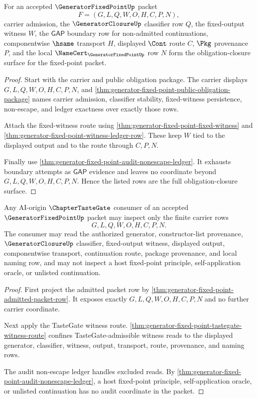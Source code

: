 \begin{theorem}
\label{thm:generator-fixed-point-obligation-closure-readiness}
For an accepted $\GeneratorFixedPointUp$ packet
$$
F=(G,L,Q,W,O,H,C,P,N),
$$
carrier admission, the $\GeneratorClosureUp$ classifier row $Q$, the fixed-output witness $W$, the $\mathsf{GAP}$ boundary row for non-admitted continuations, componentwise $\hsame$ transport $H$, displayed $\Cont$ route $C$, $\Pkg$ provenance $P$, and the local $\NameCert_{\GeneratorFixedPointUp}$ row $N$ form the obligation-closure surface for the fixed-point packet.
\end{theorem}
\begin{proof}
Start with the carrier and public obligation package. The carrier displays $G,L,Q,W,O,H,C,P,N$, and \autoref{thm:generator-fixed-point-public-obligation-package} names carrier admission, classifier stability, fixed-witness persistence, non-escape, and ledger exactness over exactly those rows.

Attach the fixed-witness route using \autoref{thm:generator-fixed-point-fixed-witness} and \autoref{thm:generator-fixed-point-witness-ledger-row}. These keep $W$ tied to the displayed output and to the route through $C,P,N$.

Finally use \autoref{thm:generator-fixed-point-audit-nonescape-ledger}. It exhausts boundary attempts as $\mathsf{GAP}$ evidence and leaves no coordinate beyond $G,L,Q,W,O,H,C,P,N$. Hence the listed rows are the full obligation-closure surface.
\end{proof}

\begin{theorem}
\label{thm:generator-fixed-point-tastegate-carrier-surface}
Any AI-origin $\ChapterTasteGate$ consumer of an accepted $\GeneratorFixedPointUp$ packet may inspect only the finite carrier rows
$$
G,L,Q,W,O,H,C,P,N.
$$
The consumer may read the authorized generator, constructor-list provenance, $\GeneratorClosureUp$ classifier, fixed-output witness, displayed output, componentwise transport, continuation route, package provenance, and local naming row, and may not inspect a host fixed-point principle, self-application oracle, or unlisted continuation.
\end{theorem}
\begin{proof}
First project the admitted packet row by \autoref{thm:generator-fixed-point-admitted-packet-row}. It exposes exactly $G,L,Q,W,O,H,C,P,N$ and no further carrier coordinate.

Next apply the TasteGate witness route. \autoref{thm:generator-fixed-point-tastegate-witness-route} confines TasteGate-admissible witness reads to the displayed generator, classifier, witness, output, transport, route, provenance, and naming rows.

The audit non-escape ledger handles excluded reads. By \autoref{thm:generator-fixed-point-audit-nonescape-ledger}, a host fixed-point principle, self-application oracle, or unlisted continuation has no audit coordinate in the packet.
\end{proof}

